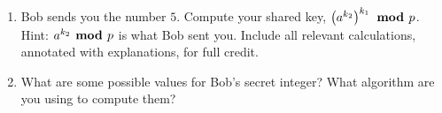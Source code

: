 \documentclass[12pt, oneside]{article}
\begin{document}
\begin{enumerate}[labelindent=0pt, leftmargin=0pt]
\begin{enumerate}
\begin{algorithm}[caption={Modular Exponentation}]
    procedure $modular~exponentiation$($b$: integer; 
                 $n = (a_{k-1}a_{k-2} \ldots a_1 a_0)_2$, $m$: positive integers)
    $x$ := $1$
    $power$ := $b$ mod $m$
    for $i$:= $0$ to $k-1$
      if $a_i = 1$ then $x$:= $(x \cdot power)$ mod $m$
      $power$ := $(power \cdot power)$ mod $m$
    return $x$ $\{x~\textrm{equals}~b^n \textbf{ mod } m\} $
\end{algorithm}         
        \item  Bob sends you the number $5$. Compute  your shared key, $\left(a^{k_2}\right)^{k_1}  
        \textrm{\bf ~mod~} p$.
        Hint: $a^{k_2} \textrm{\bf ~mod~} p$ is what Bob sent you.  Include all relevant calculations, annotated with explanations, 
        for full credit.
        
        
        \item What are some possible values for Bob's secret integer?  What 
        algorithm are you using to compute them?
        \end{enumerate}


    \end{enumerate}
\end{document}
